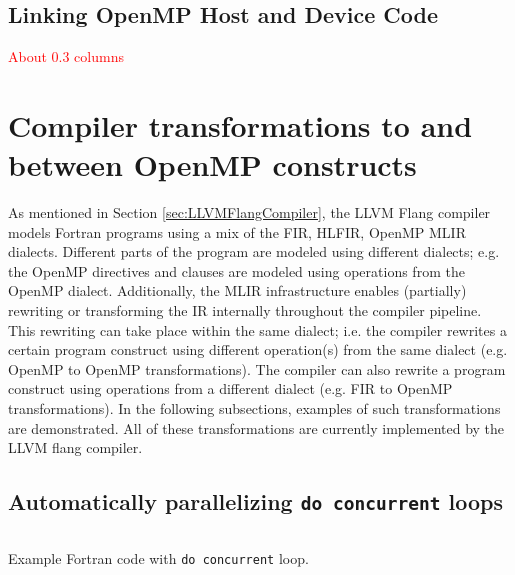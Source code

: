 \documentclass[acmtog,natbib=false]{acmart}
\newcommand{\todo}[1]{\textcolor{red}{#1}}
\newcommand{\code}[1]{\texttt{#1}\xspace}
\begin{document}

\subsection{Linking OpenMP Host and Device Code}
\label{sec:LinkingOpenMPHostandDeviceCode}

\todo{About 0.3 columns}


\section{Compiler transformations to and between OpenMP constructs}

As mentioned in Section \ref{sec:LLVMFlangCompiler}, the LLVM Flang compiler models Fortran programs using a mix of the \ac{FIR}, \ac{HLFIR}, OpenMP \ac{MLIR} dialects.
Different parts of the program are modeled using different dialects; e.g. the OpenMP directives and clauses are modeled using operations from the OpenMP dialect.
Additionally, the \ac{MLIR} infrastructure enables (partially) rewriting or transforming the IR internally throughout the compiler pipeline.
This rewriting can take place within the same dialect; i.e. the compiler rewrites a certain program construct using different operation(s) from the same dialect (e.g. OpenMP to OpenMP transformations).
The compiler can also rewrite a program construct using operations from a different dialect (e.g. \ac{FIR} to OpenMP transformations).
In the following subsections, examples of such transformations are demonstrated.
All of these transformations are currently implemented by the LLVM flang compiler.

\subsection{Automatically parallelizing \code{do concurrent} loops}

\begin{listing}[t]
\inputminted{Fortran}{code/dc_saxpy.f90}
\caption{Example Fortran code with \code{do concurrent} loop.}
\label{lst:DCExample}
\end{listing}
\end{document}
